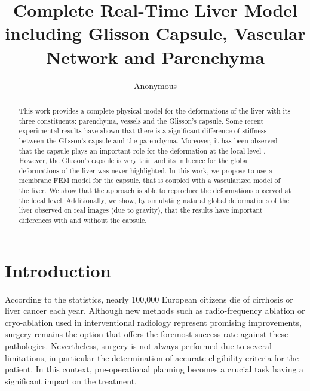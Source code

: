 \documentclass{llncs}
\begin{document}
%
%
\mainmatter              %
%
\title{Complete Real-Time Liver Model including Glisson Capsule, Vascular Network and Parenchyma}
%
%
\author{Anonymous}
%
%
%
\maketitle

\begin{abstract}
This work provides a complete physical model for the deformations of the liver with its three constituents: parenchyma, vessels and the Glisson's capsule.
Some recent experimental results \cite{Ahn2010} have shown that there is a significant difference of stiffness between the Glisson's capsule and the parenchyma. 
Moreover, it has been observed that the capsule plays an important role for the deformation at the local level \cite{Hollenstein2006}.
However, the Glisson's capsule is very thin and its influence for the global deformations of the liver was never highlighted.
In this work, we propose to use a membrane FEM model for the capsule, that is coupled with a vascularized model of the liver.
We show that the approach is able to reproduce the deformations observed at the local level.
Additionally, we show, by simulating natural global deformations of the liver observed on real images (due to gravity), that the results have important differences with and without the capsule.

\end{abstract}

\section{Introduction} 
According to the statistics, nearly 100,000 European citizens die of cirrhosis or liver cancer each year. 
Although new methods such as radio-frequency ablation or cryo-ablation used in interventional radiology 
represent promising improvements, surgery remains the option that offers the foremost success rate against these pathologies. 
Nevertheless, surgery is not always performed due to several limitations, in particular the determination 
of accurate eligibility criteria for the patient. 
In this context, pre-operational planning becomes a crucial task having a significant impact on the treatment. 
\end{document}
